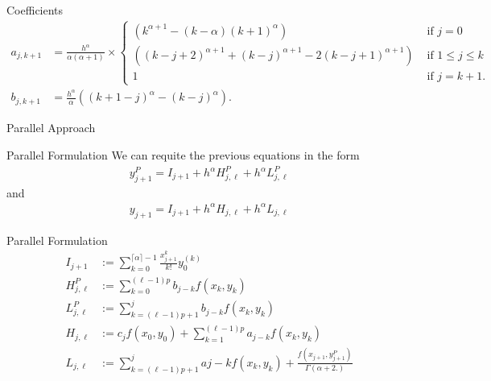 \documentclass[pdf]{beamer}
\begin{document}
\begin{frame}{Coefficients}
\begin{align*}
    a_{j,k+1} &= \frac{h^\alpha}{\alpha(\alpha+1)} \times
    \begin{cases}
        (k^{\alpha+1}-(k-\alpha)(k+1)^\alpha) & \text{ if } j = 0 \\
        ((k-j+2)^{\alpha + 1} + (k-j)^{\alpha+1} - 2(k-j+1)^{\alpha+1}) & \text{ if } 1 \leq j \leq k \\
        1 & \text{ if } j = k + 1.
    \end{cases} \\
    b_{j,k+1} &= \frac{h^\alpha}{\alpha} \left( (k+1-j)^\alpha - (k-j)^\alpha \right).
\end{align*}
\end{frame}

\begin{frame}{Parallel Approach}
\resizebox{300pt}{!}{

}
\end{frame}
\begin{frame}{Parallel Formulation}
We can requite the previous equations in the form
\begin{align*}
y_{j+1}^P = I_{j+1} + h^\alpha H_{j,\ell}^P + h^\alpha L_{j,\ell}^P
\end{align*}
and
\begin{align*}
y_{j+1} = I_{j+1} + h^{\alpha} H_{j,\ell} + h^\alpha L_{j,\ell}
\end{align*}
\end{frame}
\begin{frame}{Parallel Formulation}
\begin{align*}
I_{j+1} & := \sum_{k=0}^{\lceil \alpha \rceil -1} \frac{x_{j+1}^k}{k!} y_0^{(k)} \\
H^P_{j,\ell} & := \sum_{k=0}^{(\ell-1)p} b_{j-k} f(x_k, y_k) \\
L_{j,\ell}^P & := \sum_{k=(\ell-1)p+1}^{j} b_{j-k} f(x_k,y_k) \\
H_{j,\ell} & := c_j f(x_0, y_0) + \sum_{k=1}^{(\ell - 1)p} a_{j-k}f(x_k, y_k) \\
L_{j,\ell} & := \sum_{k=(\ell-1)p + 1}^j a{j-k} f(x_k, y_k) + \frac{f(x_{j+1}, y^P_{j+1})}{\Gamma(\alpha + 2.)}
\end{align*}
\end{frame}
\end{document}
